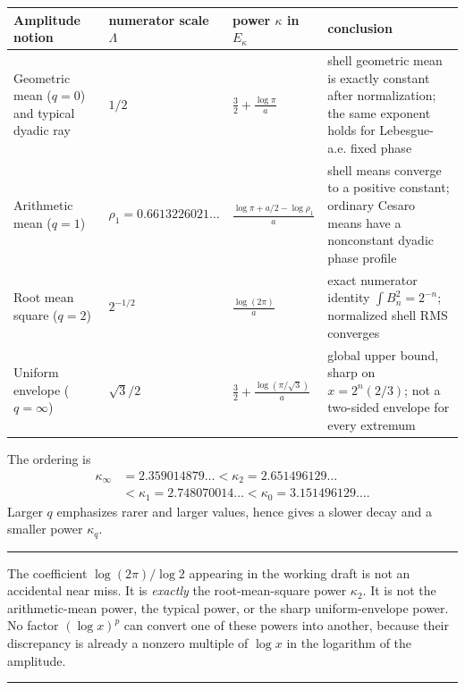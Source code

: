 \documentclass[11pt,oneside]{article}
\numberwithin{equation}{section}
\theoremstyle{definition}
\theoremstyle{remark}
\newenvironment{boxedremark}{%
  \par\smallskip\noindent\begin{center}\begin{minipage}{0.94\textwidth}%
  \color{black}\hrule\vspace{0.6em}\small
}{%
  \vspace{0.6em}\hrule\end{minipage}\end{center}\smallskip
}
\begin{document}
\begin{center}
\begin{tabularx}{\textwidth}{@{}>{\raggedright\arraybackslash}p{}
  >{\centering\arraybackslash}p{}
  >{\centering\arraybackslash}p{}
  X@{}}
\toprule
Amplitude notion & numerator scale $\Lambda$ & power $\kappa$ in $E_\kappa$ & conclusion\\
\midrule
Geometric mean ($q=0$) and typical dyadic ray
 & $1/2$
 & $\displaystyle \frac32+\frac{\log\pi}{a}$
 & shell geometric mean is exactly constant after normalization; the same exponent holds
   for Lebesgue-a.e. fixed phase\\[0.7em]
Arithmetic mean ($q=1$)
 & $\rho_1=0.6613226021\ldots$
 & $\displaystyle \frac{\log\pi+a/2-\log\rho_1}{a}$
 & shell means converge to a positive constant; ordinary Cesaro means have a nonconstant
   dyadic phase profile\\[0.7em]
Root mean square ($q=2$)
 & $2^{-1/2}$
 & $\displaystyle \frac{\log(2\pi)}{a}$
 & exact numerator identity $\int B_n^2=2^{-n}$; normalized shell RMS converges\\[0.7em]
Uniform envelope ($q=\infty$)
 & $\sqrt3/2$
 & $\displaystyle \frac32+\frac{\log(\pi/\sqrt3)}{a}$
 & global upper bound, sharp on $x=2^n(2/3)$; not a two-sided envelope for every extremum\\
\bottomrule
\end{tabularx}
\end{center}

The ordering is
\begin{equation}
 \begin{aligned}
 \kappa_\infty&=2.359014879\ldots<\kappa_2=2.651496129\ldots\\
 &<\kappa_1=2.748070014\ldots<\kappa_0=3.151496129\ldots .
 \end{aligned}
 \label{eq:kappa-order}
\end{equation}
Larger $q$ emphasizes rarer and larger values, hence gives a slower decay and a smaller
power $\kappa_q$.

\begin{boxedremark}
The coefficient $\log(2\pi)/\log2$ appearing in the working draft is not an accidental
near miss.  It is \emph{exactly} the root-mean-square power $\kappa_2$.  It is not the
arithmetic-mean power, the typical power, or the sharp uniform-envelope power.  No factor
$(\log x)^p$ can convert one of these powers into another, because their discrepancy is
already a nonzero multiple of $\log x$ in the logarithm of the amplitude.
\end{boxedremark}
\end{document}
